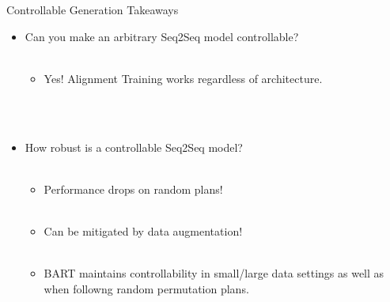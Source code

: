 \begin{frame}{Controllable Generation Takeaways}


\begin{itemize}
\item Can you make an arbitrary Seq2Seq model controllable? \\~\\
    \begin{itemize}
            
\item<2->{\alert{Yes! Alignment Training works regardless of architecture.}} \end{itemize}~\\ ~\\
            


\item How robust is a controllable Seq2Seq model? \\~\\
    \begin{itemize}
        \item<3->{\alert{Performance drops on random  plans!}}\\~\\
\item<4->{\alert{Can be mitigated by data augmentation!}}\\~\\
\item<5->{\alert{BART maintains controllability in small/large data settings as well as when followng random permutation plans.}}\\
    \end{itemize}
\end{itemize}

\end{frame}

